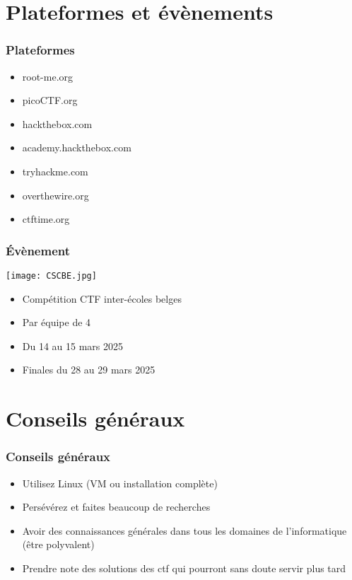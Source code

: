 \documentclass{beamer}
\begin{document}

\section{Plateformes et évènements}

\begin{frame}\frametitle{Plateformes}
    \begin{itemize}
        \item root-me.org
        \item picoCTF.org        
        \item hackthebox.com
        \item academy.hackthebox.com
        \item tryhackme.com
        \item overthewire.org
        \item ctftime.org
    \end{itemize}
\end{frame}



\begin{frame}
\frametitle{Évènement}
\begin{center}
    \texttt{[image: CSCBE.jpg]}
\end{center}

\begin{itemize}
    \item Compétition CTF inter-écoles belges\\
    \item Par équipe de 4\\
    \item Du 14 au 15 mars 2025
    \item Finales du 28 au 29 mars 2025
\end{itemize}

    
\end{frame}

{

}
\section{Conseils généraux}

\begin{frame}
\frametitle{Conseils généraux}

\begin{itemize}
    \item Utilisez Linux (VM ou installation complète)
    \pause
    \item Persévérez et faites beaucoup de recherches
    \pause
    \item Avoir des connaissances générales dans tous les domaines de l'informatique (être polyvalent)
    \pause
    \item Prendre note des solutions des ctf qui pourront sans doute servir plus tard
\end{itemize}

\end{frame}
\end{document}

